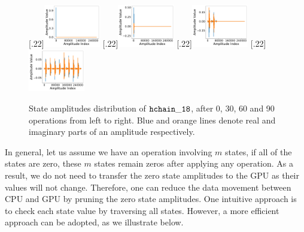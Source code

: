 \begin{figure}[h!]
    \centering
    \subcaptionbox{\label{fig:step0}}[.22\textwidth]{\includegraphics[width=0.22\textwidth]{Images/appendix2/section-4/state_vec_0.pdf}}
    \hspace{-5pt}
    \subcaptionbox{\label{fig:step30}}[.22\textwidth]{\includegraphics[width=0.22\textwidth]{Images/appendix2/section-4/state_vec_30.pdf}}
    \subcaptionbox{\label{fig:step60}}[.22\textwidth]{\includegraphics[width=0.22\textwidth]{Images/appendix2/section-4/state_vec_60.pdf}}
    \vspace{-5pt}
    \subcaptionbox{\label{fig:step90}}[.22\textwidth]{\includegraphics[width=0.22\textwidth]{Images/appendix2/section-4/state_vec_90.pdf}}
    \vspace{-5pt}
    \caption{State amplitudes distribution of {$\tt hchain\_18$}, after 0, 30, 60 and 90 operations from left to right. Blue and orange lines denote real and imaginary parts of an amplitude respectively.}
    \vspace{-5pt}
\label{fig:hchain18state}
\end{figure}

\par In general, let us assume we have an operation involving $m$ states, if all of the states are zero, these $m$ states remain zeros after applying any operation. As a result, we do not need to transfer the zero state amplitudes to the GPU as their values will not change. Therefore, one can reduce the data movement between CPU and GPU by  pruning the zero state amplitudes. One intuitive approach is to check each state value by traversing all states. However, a more efficient approach can be adopted, as we illustrate below.


